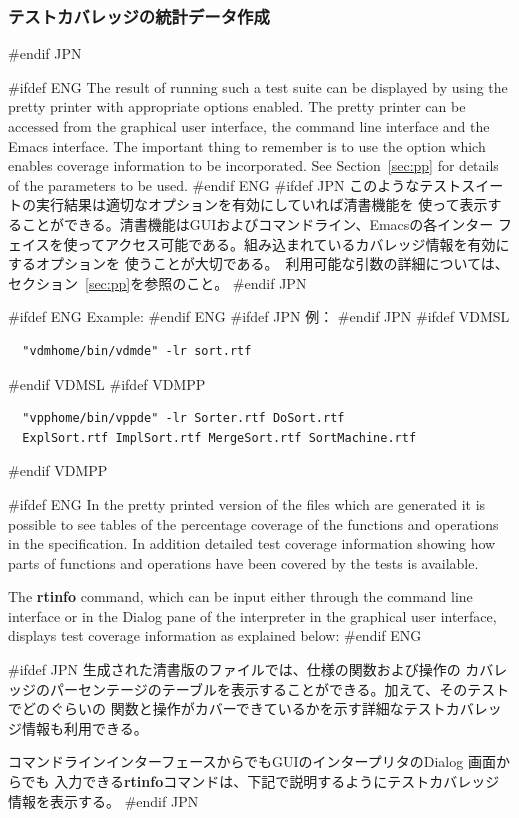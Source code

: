 \documentclass[\pformat,12pt]{article}
\newcommand{\guicmd}[1]{{\sf #1}}
\newcommand{\guicmd}[1]{{\gt #1}}
\begin{document}
\subsubsection{テストカバレッジの統計データ作成}
#endif JPN

#ifdef ENG
The result of running such a test suite can be displayed by using the
pretty printer with appropriate options enabled.  The pretty printer
can be accessed from the graphical user interface, the command
line interface and the Emacs interface. The important thing to
remember is to use the option which enables coverage information to be
incorporated. See Section~\ref{sec:pp} for details of the
parameters to be used.
#endif ENG
#ifdef JPN
このようなテストスイートの実行結果は適切なオプションを有効にしていれば清書機能を
使って表示することができる。清書機能はGUIおよびコマンドライン、Emacsの各インター
フェイスを使ってアクセス可能である。組み込まれているカバレッジ情報を有効にするオプションを
使うことが大切である。　利用可能な引数の詳細については、セクション~\ref{sec:pp}を参照のこと。
#endif JPN

#ifdef ENG
Example:
#endif ENG
#ifdef JPN
例：
#endif JPN
#ifdef VDMSL
\begin{verbatim}
  "vdmhome/bin/vdmde" -lr sort.rtf
\end{verbatim}
#endif VDMSL
#ifdef VDMPP
\begin{verbatim}
  "vpphome/bin/vppde" -lr Sorter.rtf DoSort.rtf
  ExplSort.rtf ImplSort.rtf MergeSort.rtf SortMachine.rtf
\end{verbatim}
#endif VDMPP

#ifdef ENG
In the pretty printed version of the files which are generated it is
possible to see tables of the percentage coverage of the functions
and operations in the specification. In addition detailed test
coverage information showing how parts of functions and operations
have been covered by the tests is available.

The \textbf{rtinfo} command, which can be input either through the command
line interface or in the \guicmd{Dialog} pane of the interpreter in  the
graphical user interface, displays test coverage information as
explained below:
#endif ENG

#ifdef JPN
生成された清書版のファイルでは、仕様の関数および操作の
カバレッジのパーセンテージのテーブルを表示することができる。加えて、そのテストでどのぐらいの
関数と操作がカバーできているかを示す詳細なテストカバレッジ情報も利用できる。

コマンドラインインターフェースからでもGUIのインタープリタの\guicmd{Dialog} 画面からでも
入力できる\textbf{rtinfo}コマンドは、下記で説明するようにテストカバレッジ情報を表示する。
#endif JPN
\end{document}
